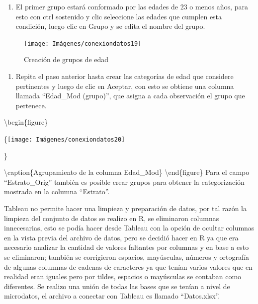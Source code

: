 \documentclass[
]{book}
\providecommand{\tightlist}{%
  \setlength{\itemsep}{0pt}\setlength{\parskip}{0pt}}
\begin{document}
\begin{enumerate}
\def\labelenumi{\arabic{enumi}.}
\setcounter{enumi}{1}
\tightlist
\item
  El primer grupo estará conformado por las edades de 23 o menos años, para esto con ctrl sostenido y clic seleccione las edades que cumplen esta condición, luego clic en Grupo y se edita el nombre del grupo.
\end{enumerate}

\begin{figure}

{\centering \texttt{[image: Imágenes/conexiondatos19]} 

}

\caption{Creación de grupos de edad}\label{fig:crearprimergrupo-fig}
\end{figure}

\begin{enumerate}
\def\labelenumi{\arabic{enumi}.}
\setcounter{enumi}{2}
\tightlist
\item
  Repita el paso anterior hasta crear las categorías de edad que considere pertinentes y luego de clic en Aceptar, con esto se obtiene una columna llamada ``Edad\_Mod (grupo)'', que asigna a cada observación el grupo que pertenece.
\end{enumerate}

\textbackslash begin\{figure\}

\{\centering \texttt{[image: Imágenes/conexiondatos20]}

\}

\textbackslash caption\{Agrupamiento de la columna Edad\_Mod\}\label{fig:gruposedad-fig}
\textbackslash end\{figure\}
Para el campo ``Estrato\_Orig'' también es posible crear grupos para obtener la categorización mostrada en la columna ``Estrato''.

Tableau no permite hacer una limpieza y preparación de datos, por tal razón la limpieza del conjunto de datos se realizo en R, se eliminaron columnas innecesarias, esto se podía hacer desde Tableau con la opción de ocultar columnas en la vista previa del archivo de datos, pero se decidió hacer en R ya que era necesario analizar la cantidad de valores faltantes por columnas y en base a esto se eliminaron; también se corrigieron espacios, mayúsculas, números y ortografía de algunas columnas de cadenas de caracteres ya que tenían varios valores que en realidad eran iguales pero por tildes, espacios o mayúsculas se contaban como diferentes. Se realizo una unión de todas las bases que se tenían a nivel de microdatos, el archivo a conectar con Tableau es llamado ``Datos.xlsx''.
\end{document}
